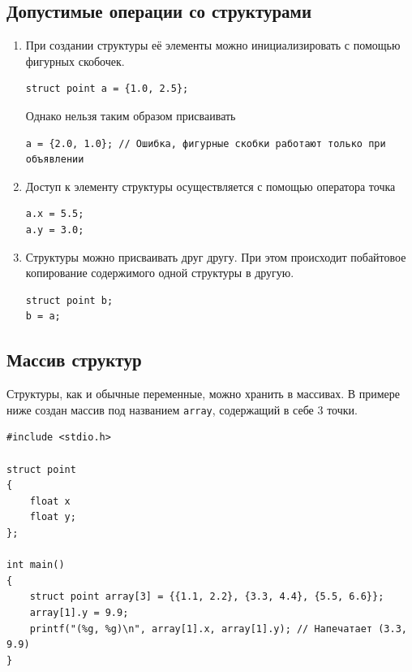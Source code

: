 \documentclass[10pt]{article}
\begin{document}
\subsection*{Допустимые операции со структурами}
\begin{enumerate}
\item При создании структуры её элементы можно инициализировать с помощью фигурных скобочек.
\begin{lstlisting}
struct point a = {1.0, 2.5};
\end{lstlisting}
Однако нельзя таким образом присваивать
\begin{lstlisting}
a = {2.0, 1.0}; // Ошибка, фигурные скобки работают только при объявлении
\end{lstlisting}
\item Доступ к элементу структуры осуществляется с помощью оператора точка
\begin{lstlisting}
a.x = 5.5;
a.y = 3.0;
\end{lstlisting}
\item Структуры можно присваивать друг другу. При этом происходит побайтовое копирование содержимого одной структуры в другую.
\begin{lstlisting}
struct point b;
b = a;
\end{lstlisting}
\end{enumerate}

\subsection*{Массив структур}
Структуры, как и обычные переменные, можно хранить в массивах. В примере ниже создан массив под названием \texttt{array}, содержащий в себе 3 точки.
\begin{lstlisting}
#include <stdio.h>

struct point 
{
    float x
    float y;
};

int main() 
{
    struct point array[3] = {{1.1, 2.2}, {3.3, 4.4}, {5.5, 6.6}};
    array[1].y = 9.9;
    printf("(%g, %g)\n", array[1].x, array[1].y); // Напечатает (3.3, 9.9)
}
\end{lstlisting}
\end{document}
